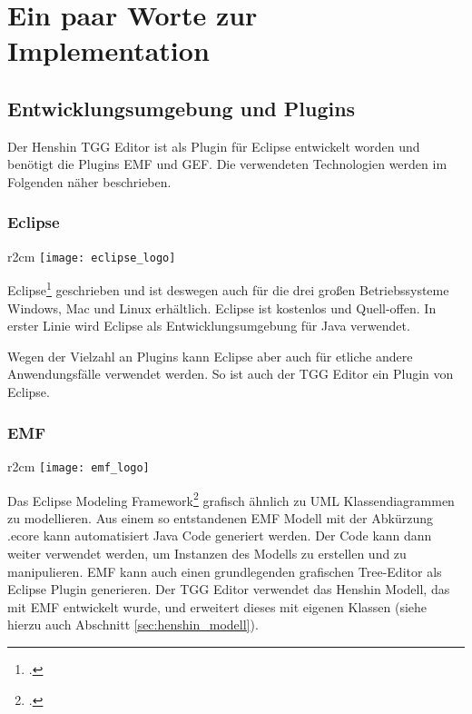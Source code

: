 \section{Ein paar Worte zur Implementation}\label{sec:implementation}
\subsection{Entwicklungsumgebung und Plugins}
Der Henshin TGG Editor ist als Plugin für Eclipse entwickelt worden und benötigt
die Plugins EMF und GEF. Die verwendeten Technologien werden im Folgenden
näher beschrieben.

\subsubsection{Eclipse}
\begin{wrapfigure}{r}{2cm}
	\centering
	\texttt{[image: eclipse\_logo]}
	\label{fig:eclipse_logo}
\end{wrapfigure}
Eclipse\footcite[][\url{http://www.eclipse.org/}]{eclipsewebsite}
geschrieben und ist deswegen auch für die drei großen Betriebssysteme Windows,
Mac und Linux erhältlich. Eclipse ist kostenlos und Quell-offen. In erster Linie
wird Eclipse als Entwicklungsumgebung für Java verwendet. 

Wegen der Vielzahl an Plugins kann Eclipse aber auch für etliche andere Anwendungsfälle verwendet werden. So ist auch der TGG Editor ein Plugin von Eclipse.

\subsubsection{EMF}
\begin{wrapfigure}{r}{2cm}
	\centering
	\texttt{[image: emf\_logo]}
	\label{fig:emf_logo}
\end{wrapfigure}
Das Eclipse Modeling Framework\footcite[][\url{http://www.eclipse.org/modeling/emf/}]{emfwebsite}
grafisch ähnlich zu UML Klassendiagrammen zu modellieren. Aus einem so
entstandenen EMF Modell mit der Abkürzung .ecore kann automatisiert Java Code
generiert werden. Der Code kann dann weiter verwendet werden, um Instanzen des
Modells zu erstellen und zu manipulieren. EMF kann auch einen grundlegenden
grafischen Tree-Editor als Eclipse Plugin generieren. Der TGG Editor verwendet
das Henshin Modell, das mit EMF entwickelt wurde, und erweitert dieses mit
eigenen Klassen (siehe hierzu auch Abschnitt \ref{sec:henshin_modell}).

